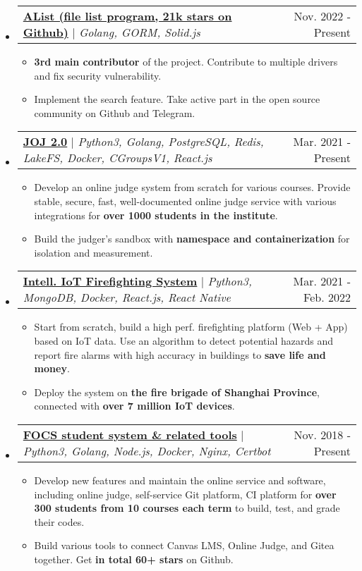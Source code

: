 \documentclass[letterpaper,11pt]{article}
\makeatletter
\newcommand{\resumeItem}[1]{
  \item\small{
    {#1 \vspace{-2pt}}
  }
}
\newcommand{\resumeProjectHeader}[2]{
    \item
    \begin{tabular*}{0.97\textwidth}{l@{\extracolsep{\fill}}r}
      \small#1 & #2 \\
    \end{tabular*}\vspace{-7pt}
}
\newcommand{\resumeSubHeaderListStart}{\begin{itemize}[leftmargin=0.15in, label={}]}
\newcommand{\resumeSubHeaderListEnd}{\end{itemize}}
\newcommand{\resumeItemListStart}{\begin{itemize}}
\newcommand{\resumeItemListEnd}{\end{itemize}\vspace{-5pt}}
\makeatother
\begin{document}
    \resumeSubHeaderListStart
      \resumeProjectHeader
        {\href{https://github.com/alist-org/alist}{\textbf{AList (file list program, 21k stars on Github)}} $|$ \emph{Golang, GORM, Solid.js}}{Nov. 2022 - Present}
        \resumeItemListStart
          \resumeItem{\textbf{3rd main contributor} of the project. Contribute to multiple drivers and fix security vulnerability.}
          \resumeItem{Implement the search feature. Take active part in the open source community on Github and Telegram.}
        \resumeItemListEnd
      \resumeProjectHeader
        {\href{https://github.com/joint-online-judge}{\textbf{JOJ 2.0}} $|$ \emph{Python3, Golang, PostgreSQL, Redis, LakeFS, Docker, CGroupsV1, React.js}}{Mar. 2021 - Present}
        \resumeItemListStart
          \resumeItem{Develop an online judge system from scratch for various courses. Provide stable, secure, fast, well-documented online judge service with various integrations for \textbf{over 1000 students in the institute}.}
          \resumeItem{Build the judger's sandbox with \textbf{namespace and containerization} for isolation and measurement.}
        \resumeItemListEnd
      \resumeProjectHeader
        {\href{https://github.com/SJTU-IPP-Firefighting}{\textbf{Intell. IoT Firefighting System}} $|$ \emph{Python3, MongoDB, Docker, React.js, React Native}}{Mar. 2021 - Feb. 2022}
        \resumeItemListStart
          \resumeItem{Start from scratch, build a high perf. firefighting platform (Web + App) based on IoT data. Use an algorithm to detect potential hazards and report fire alarms with high accuracy in buildings to \textbf{save life and money}.}
          \resumeItem{Deploy the system on \textbf{the fire brigade of Shanghai Province}, connected with \textbf{over 7 million IoT devices}.}
        \resumeItemListEnd
      \resumeProjectHeader
        {\href{https://gist.github.com/BoYanZh/fc4469c20fd6adf42c212114532aaac0}{\textbf{FOCS student system \& related tools}} $|$ \emph{Python3, Golang, Node.js, Docker, Nginx, Certbot}}{Nov. 2018 - Present}
        \resumeItemListStart
          \resumeItem{Develop new features and maintain the online service and software, including online judge, self-service Git platform, CI platform for \textbf{over 300 students from 10 courses each term} to build, test, and grade their codes.}
          \resumeItem{Build various tools to connect Canvas LMS, Online Judge, and Gitea together. Get \textbf{in total 60+ stars} on Github.}
        \resumeItemListEnd
    \resumeSubHeaderListEnd


%
\end{document}

